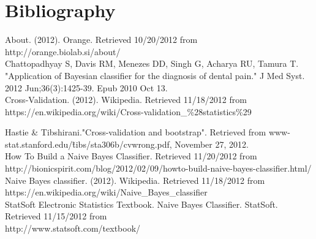 

\graphicspath{{C:/Documents and Settings/amcelhinney/My Documents/GitHub/MCS507ProjectTwo/tex/include/}}
\newpage

\section{Bibliography} %

\hspace{5 mm}About. (2012). Orange. Retrieved 10/20/2012 from http://orange.biolab.si/about/\\

Chattopadhyay S, Davis RM, Menezes DD, Singh G, Acharya RU, Tamura T. "Application of Bayesian classifier for the diagnosis of dental pain." J Med Syst. 2012 Jun;36(3):1425-39. Epub 2010 Oct 13. \\

Cross-Validation. (2012). Wikipedia. Retrieved 11/18/2012 from \\
https://en.wikipedia.org/wiki/Cross-validation\_\%28statistics\%29

\hspace{5 mm} Hastie \& Tibshirani."Cross-validation and bootstrap". Retrieved from www-stat.stanford.edu/\~tibs/sta306b/cvwrong.pdf, November 27, 2012.\\

How To Build a Naive Bayes Classifier. Retrieved 11/20/2012 from \\http://bionicspirit.com/blog/2012/02/09/howto-build-naive-bayes-classifier.html/\\

Naive Bayes classifier. (2012). Wikipedia. Retrieved 11/18/2012 from \\
https://en.wikipedia.org/wiki/Naive\_Bayes\_classifier\\

StatSoft Electronic Statistics Textbook. Naive Bayes Classifier. StatSoft. Retrieved 11/15/2012 from 
\\http://www.statsoft.com/textbook/\\

